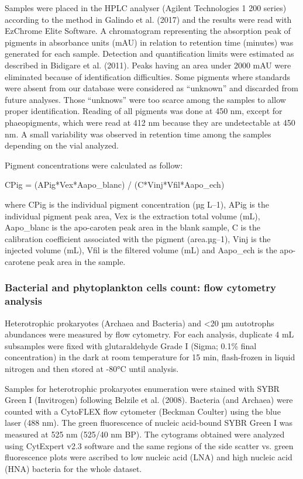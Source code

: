 \documentclass[essd, manuscript]{copernicus}
\begin{document}
Samples were placed in the HPLC analyser (Agilent Technologies 1 200 series) according to the method in Galindo et al. (2017) and the results were read with EzChrome Elite Software. A chromatogram representing the absorption peak of pigments in absorbance units (mAU) in relation to retention time (minutes) was generated for each sample. Detection and quantification limits were estimated as described in Bidigare et al. (2011). Peaks having an area under 2000 mAU were eliminated because of identification difficulties. Some pigments where standards were absent from our database were considered as “unknown” and discarded from future analyses. Those “unknows” were too scarce among the samples to allow proper identification. Reading of all pigments was done at 450 nm, except for phaeopigments, which were read at 412 nm because they are undetectable at 450 nm. A small variability was observed in retention time among the samples depending on the vial analyzed.
 
Pigment concentrations were calculated as follow:


CPig = (APig*Vex*Aapo\_blanc) / (C*Vinj*Vfil*Aapo\_ech)
 
where CPig is the individual pigment concentration (µg L–1), APig is the individual pigment peak area, Vex is the extraction total volume (mL), Aapo\_blanc is the apo-caroten peak area in the blank sample, C is the calibration coefficient associated with the pigment (area.µg–1), Vinj is the injected volume (mL), Vfil is the filtered volume (mL) and Aapo\_ech is the apo-carotene peak area in the sample.


\subsubsection{Bacterial and phytoplankton cells count: flow cytometry analysis}
Heterotrophic prokaryotes (Archaea and Bacteria) and <20 µm autotrophs abundances were measured by flow cytometry. For each analysis, duplicate 4 mL subsamples were fixed with glutaraldehyde Grade I (Sigma; 0.1\% final concentration) in the dark at room temperature for 15 min, flash-frozen in liquid nitrogen and then stored at -80°C until analysis. 
 
Samples for heterotrophic prokaryotes enumeration were stained with SYBR Green I (Invitrogen) following Belzile et al. (2008). Bacteria (and Archaea) were counted with a CytoFLEX flow cytometer (Beckman Coulter) using the blue laser (488 nm). The green fluorescence of nucleic acid-bound SYBR Green I was measured at 525 nm (525/40 nm BP). The cytograms obtained were analyzed using CytExpert v2.3 software and the same regions of the side scatter vs. green fluorescence plots were ascribed to low nucleic acid (LNA) and high nucleic acid (HNA) bacteria for the whole dataset.
 
\end{document}
